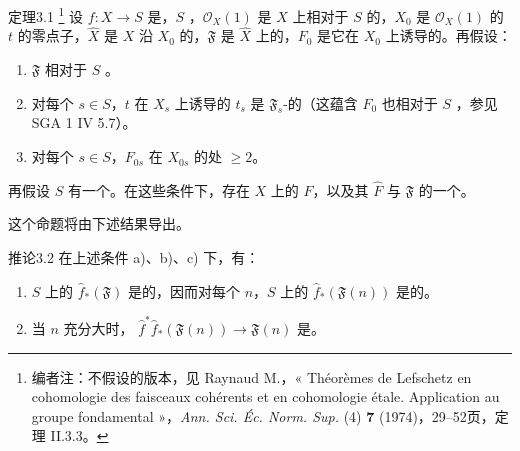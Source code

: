 \begin{SGAresult}{定理}{3.1}
\footnote{编者注：不假设的版本，见 Raynaud M.，« Théorèmes de Lefschetz en cohomologie des faisceaux cohérents et en cohomologie étale. Application au groupe fondamental »，\emph{Ann. Sci. Éc. Norm. Sup.} (4) \textbf{7} (1974)，29--52页，定理 II.3.3。}
设 $f:X\to S$ 是，$S$ ，$\mathcal O_X(1)$ 是 $X$ 上相对于 $S$ 的，$X_0$ 是 $\mathcal O_X(1)$ 的 $t$ 的零点子，$\widehat X$ 是 $X$ 沿 $X_0$ 的，$\mathfrak F$ 是 $\widehat X$ 上的，$F_0$ 是它在 $X_0$ 上诱导的。再假设：
\begin{enumerate}
\item[a)] $\mathfrak F$ 相对于 $S$ 。
\item[b)] 对每个 $s\in S$，$t$ 在 $X_s$ 上诱导的 $t_s$ 是 $\mathfrak F_s$-的（这蕴含 $F_0$ 也相对于 $S$ ，参见 SGA 1 IV 5.7）。
\item[c)] 对每个 $s\in S$，$F_{0s}$ 在 $X_{0s}$ 的处 $\geq2$。
\end{enumerate}
再假设 $S$ 有一个。在这些条件下，存在 $X$ 上的 $F$，以及其 $\widehat F$ 与 $\mathfrak F$ 的一个。
\end{SGAresult}
这个命题将由下述结果导出。
\begin{SGAresult}{推论}{3.2}
在上述条件 a)、b)、c) 下，有：
\begin{enumerate}
\item[(i)] $S$ 上的 $\widehat f_*(\mathfrak F)$ 是的，因而对每个 $n$，$S$ 上的 $\widehat f_*(\mathfrak F(n))$ 是的。
\item[(ii)] 当 $n$ 充分大时， $\widehat f^*\widehat f_*(\mathfrak F(n))\to\mathfrak F(n)$ 是。
\end{enumerate}
\end{SGAresult}
